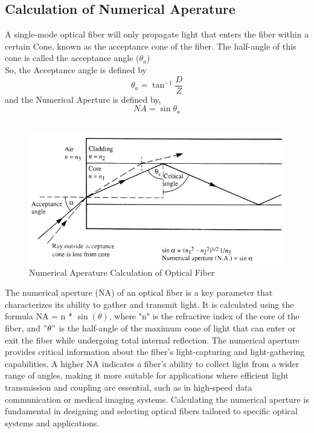 \subsection{\label{sec:intro_level3}Calculation of Numerical Aperature}
 A single-mode optical fiber will only propagate light that enters the fiber within a certain Cone, known as the acceptance cone of the fiber. The half-angle of this cone is called the acceptance angle ($\theta_{a}$) \\
    So, the Acceptance angle is defined by \\
    $$ \theta_{a} = \tan^{-1}\frac{D}{Z}$$
    and the Numerical Aperture is defined by,
    $$ NA = \sin{\theta_{a}} $$ \\
\begin{figure}
    \centering
    \includegraphics[scale=1]{chapters/image4.png}
    \caption{Numerical Aperature Calculation of Optical Fiber}
\end{figure}
The numerical aperture (NA) of an optical fiber is a key parameter that characterizes its ability to gather and transmit light. It is calculated using the formula NA = n * $\sin(\theta)$, where "n" is the refractive index of the core of the fiber, and $"\theta"$ is the half-angle of the maximum cone of light that can enter or exit the fiber while undergoing total internal reflection. The numerical aperture provides critical information about the fiber's light-capturing and light-gathering capabilities. A higher NA indicates a fiber's ability to collect light from a wider range of angles, making it more suitable for applications where efficient light transmission and coupling are essential, such as in high-speed data communication or medical imaging systems. Calculating the numerical aperture is fundamental in designing and selecting optical fibers tailored to specific optical systems and applications.
